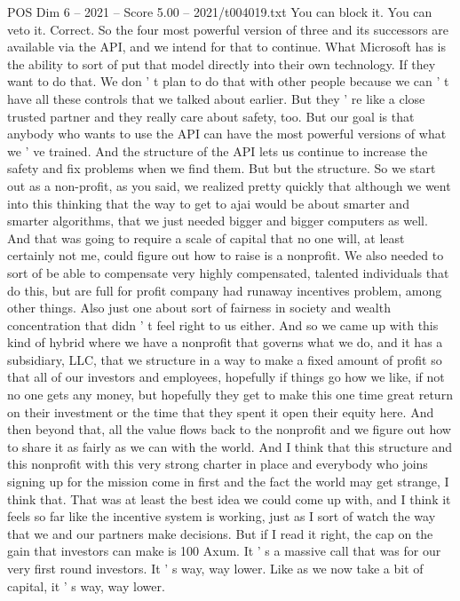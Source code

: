 \begin{textsample}{POS Dim 6 – 2021 – Score 5.00 – 2021/t004019.txt}
You can block it.
You can veto it.
Correct.
So the four most powerful version of three and its successors are available via the API, and we intend for that to continue.
What Microsoft has is the ability to sort of put that model directly into their own technology.
If they want to do that.
We don ' t plan to do that with other people because we can ' t have all these controls that we talked about earlier.
But they ' re like a close trusted partner and they really care about safety, too.
But our goal is that anybody who wants to use the API can have the most powerful versions of what we ' ve trained.
And the structure of the API lets us continue to increase the safety and fix problems when we find them.
But but the structure.
So we start out as a non-profit, as you said, we realized pretty quickly that although we went into this thinking that the way to get to ajai would be about smarter and smarter algorithms, that we just needed bigger and bigger computers as well.
And that was going to require a scale of capital that no one will, at least certainly not me, could figure out how to raise is a nonprofit.
We also needed to sort of be able to compensate very highly compensated, talented individuals that do this, but are full for profit company had runaway incentives problem, among other things.
Also just one about sort of fairness in society and wealth concentration that didn ' t feel right to us either.
And so we came up with this kind of hybrid where we have a nonprofit that governs what we do, and it has a subsidiary, LLC, that we structure in a way to make a fixed amount of profit so that all of our investors and employees, hopefully if things go how we like, if not no one gets any money, but hopefully they get to make this one time great return on their investment or the time that they spent it open their equity here.
And then beyond that, all the value flows back to the nonprofit and we figure out how to share it as fairly as we can with the world.
And I think that this structure and this nonprofit with this very strong charter in place and everybody who joins signing up for the mission come in first and the fact the world may get strange, I think that.
That was at least the best idea we could come up with, and I think it feels so far like the incentive system is working, just as I sort of watch the way that we and our partners make decisions.
But if I read it right, the cap on the gain that investors can make is 100 Axum.
It ' s a massive call that was for our very first round investors.
It ' s way, way lower.
Like as we now take a bit of capital, it ' s way, way lower.

\end{textsample}
